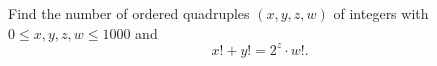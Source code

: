 Find the number of ordered quadruples $(x,y,z,w)$ of integers with $0\le x,y,z,w\le1000$ and
\[x!+y!=2^z\cdot w!.\]
